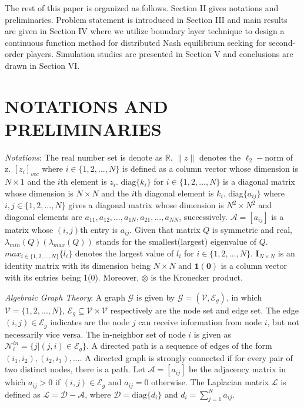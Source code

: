 \documentclass[lettersize,journal]{IEEEtran}
\begin{document}
The rest of this paper is organized as follows. Section II gives notations and preliminaries. Problem statement is introduced in Section III and main results are given in Section IV where we utilize boundary layer technique to design a continuous function method for distributed Nash equilibrium seeking for second-order players. Simulation studies are presented in Section V and conclusions are drawn in Section VI.


\section{NOTATIONS AND PRELIMINARIES}
\emph{Notations}: The real number set is denote as $\mathbb{R}$. $\|z\|$ denotes the $\ell_2-$norm of z. $[z_i]_{vec}$ where $i \in \{1,2,...,N\}$ is defined as a column vector whose dimension is $N \times 1$ and the $i$th element is $z_i$. diag$\{k_i\}$ for $i \in \{1,2,...,N\}$ is a diagonal matrix whose dimension is $N\times N$ and the $i$th diagonal element is $k_i$. diag$\{a_{ij}\}$ where $i,j \in \{1,2,...,N\}$ gives a diagonal matrix whose dimension is $N^2 \times N^2$ and diagonal elements are $a_{11},a_{12},...,a_{1N},a_{21},...,a_{NN}$, successively. $\mathcal{A} = [a_{ij}]$ is a matrix whose $(i,j)$th entry is $a_{ij}$. Given that matrix $Q$ is symmetric and real, $\lambda_{min}(Q)(\lambda_{max}(Q))$ stands for the smallest(largest) eigenvalue of $Q$. $max_{i \in \{1,2,...,N\}}\{l_i\}$ denotes the largest value of $l_i$ for $i \in \{1,2,...,N\}$. $\mathbf{I}_{N \times N}$ is an identity matrix with its dimension being $N \times N$ and $\mathbf{1}(\mathbf{0})$ is a column vector with its entries being 1(0). Moreover, $\otimes$ is the Kronecker product.

\emph{Algebraic Graph Theory}: A graph $\mathcal{G}$ is given by $\mathcal{G} = (\mathcal{V},\mathcal{E}_g)$, in which $\mathcal{V} = \{1,2,...,N\}$, $\mathcal{E}_g \subseteq \mathcal{V}\times\mathcal{V}$ respectively are the node set and edge set. The edge $(i,j) \in \mathcal{E}_g$ indicates are the node $j$ can receive information from node $i$, but not necessarily vice versa. The in-neighbor set of node $i$ is given as $\mathcal{N}_{i}^{in}=\{j|(j,i)\in\mathcal{E}_{g}\}$. A directed path is a sequence of edges of the form $(i_1,i_2), (i_2,i_3),....$ A directed graph is strongly connected if for every pair of two distinct nodes, there is a path. Let $\mathcal{A} = [a_{ij}]$ be the adjacency matrix in which $a_{ij} > 0$ if $(i,j) \in \mathcal{E}_g$ and $a_{ij} = 0$ otherwise. The Laplacian matrix $\mathcal{L}$ is defined as $\mathcal{L} = \mathcal{D} - \mathcal{A}$, where $\mathcal{D} = \text{diag}\{d_i\}$ and $d_i = \sum_{j=1}^{N}a_{ij}$.
\end{document}
